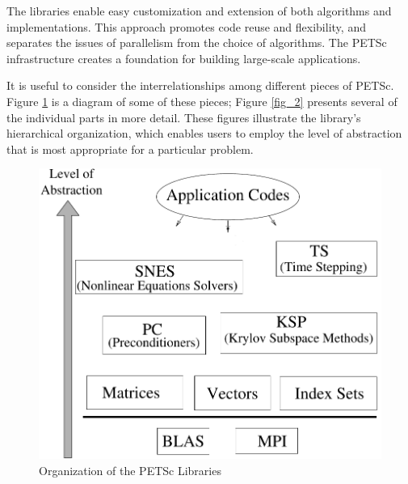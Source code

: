 The libraries enable easy customization and extension of both algorithms
and implementations.  This approach promotes code reuse and
flexibility, and separates the issues of parallelism from the choice
of algorithms.  The PETSc infrastructure creates a
foundation for building large-scale applications.

It is useful to consider the interrelationships among different
pieces of PETSc.  Figure \ref{fig_1} is a diagram of some
of these pieces; Figure \ref{fig_2} presents
several of the individual parts in more detail.
These figures illustrate the library's hierarchical organization,
which enables users to employ the level of abstraction that is most
appropriate for a particular problem.
\begin{figure}[hbt]
\centerline{ \includegraphics{petscwww}}
\caption{Organization of the PETSc Libraries}
\label{fig_1}
\end{figure}

